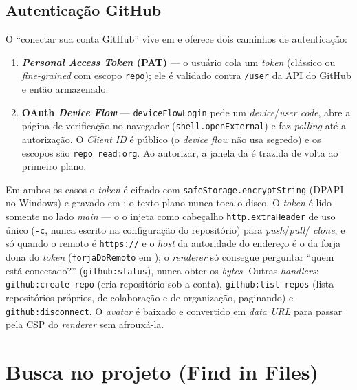 \subsection{Autenticação GitHub}
\label{sec:13-github-auth}

O \enquote{conectar sua conta GitHub} vive em  e
oferece dois caminhos de autenticação:

\begin{enumerate}[leftmargin=*]
  \item \textbf{\textit{Personal Access Token} (PAT)} — o usuário cola um
        \textit{token} (clássico ou \textit{fine-grained} com escopo
        \lstinline|repo|); ele é validado contra \lstinline|/user| da API do
        GitHub e então armazenado.
  \item \textbf{OAuth \textit{Device Flow}} — \lstinline|deviceFlowLogin| pede
        um \textit{device}/\textit{user code}, abre a página de verificação no
        navegador (\lstinline|shell.openExternal|) e faz \textit{polling} até a
        autorização. O \textit{Client ID} é público (o \textit{device flow} não
        usa segredo) e os escopos são \lstinline|repo read:org|. Ao autorizar, a
        janela da  é trazida de volta ao primeiro plano.
\end{enumerate}

Em ambos os casos o \textit{token} é cifrado com
\lstinline|safeStorage.encryptString| (DPAPI no Windows) e gravado em
; o texto plano nunca toca o disco. O
\textit{token} é lido somente no lado \textit{main} — o  o injeta
como cabeçalho \lstinline|http.extraHeader| de uso único (\lstinline|-c|, nunca
escrito na configuração do repositório) para \textit{push}/\textit{pull}/
\textit{clone}, e só quando o remoto é \lstinline|https://| e o \textit{host}
da autoridade do endereço é o da forja dona do \textit{token}
(\lstinline|forjaDoRemoto| em ); o \textit{renderer} só consegue perguntar \enquote{quem está
conectado?} (\lstinline|github:status|), nunca obter os \textit{bytes}. Outras
\textit{handlers}: \lstinline|github:create-repo| (cria repositório sob a conta),
\lstinline|github:list-repos| (lista repositórios próprios, de colaboração e de
organização, paginando) e \lstinline|github:disconnect|. O \textit{avatar} é
baixado e convertido em \textit{data URL} para passar pela CSP do
\textit{renderer} sem afrouxá-la.

\section{Busca no projeto (Find in Files)}
\label{sec:13-busca}

